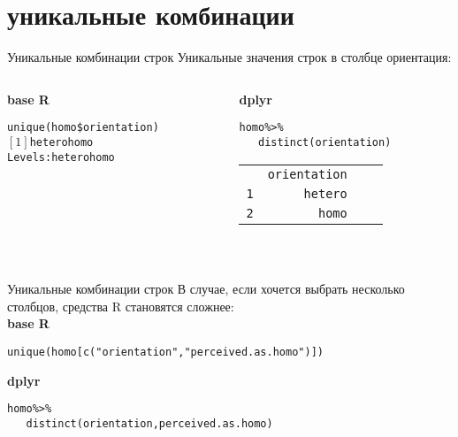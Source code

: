\section{уникальные комбинации}
\begin{frame}{Уникальные комбинации строк}
\noindent Уникальные значения строк в столбце ориентация:
\begin{columns}[T] 
\begin{column}{.62\textwidth}
\textbf{base R}\\
\scriptsize
\begin{alltt}
unique(homo\$orientation) \bigskip \\
$\left[1\right]$ hetero homo \\
Levels: hetero homo
\end{alltt}
\normalsize
\end{column}
\hfill
\begin{column}{.37\textwidth}
\textbf{dplyr}\\
\scriptsize
\begin{alltt}
homo \alert{\%>\%}\\ 
\ \ \ \alert{distinct(}orientation\alert{)} \bigskip\\
\begin{tabular}{rrrr}
& orientation\\
1 & hetero\\
2 & homo\\
\end{tabular}
\\
\end{alltt}
\normalsize
\end{column}
\end{columns}
\end{frame}
\begin{frame}{Уникальные комбинации строк}
\noindent В случае, если хочется выбрать несколько столбцов, средства R становятся сложнее: \bigskip\\
\textbf{base R}
\scriptsize
\begin{alltt}
unique(homo[c("orientation", "perceived.as.homo")])\bigskip\\
\end{alltt}
\normalsize
\textbf{dplyr}
\scriptsize
\begin{alltt}
homo \alert{\%>\% }\\
\ \ \ \alert{distinct(}orientation, perceived.as.homo\alert{)}
\end{alltt}
\normalsize
\end{frame}
